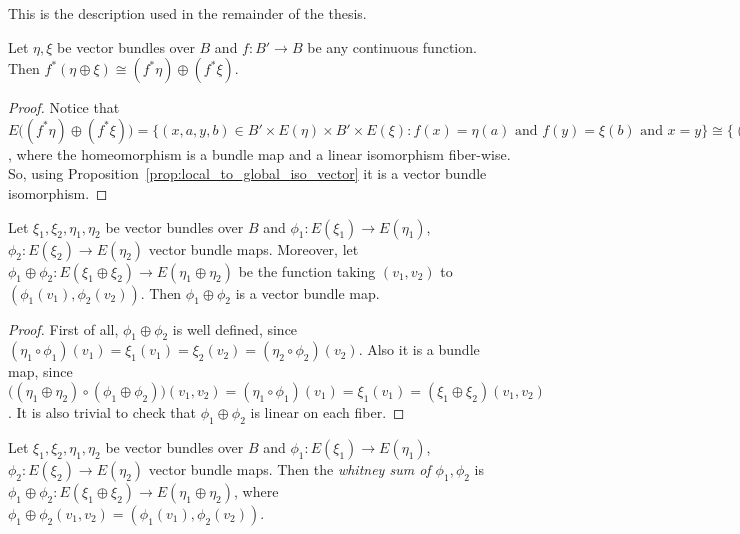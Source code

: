 This is the description used in the remainder of the thesis.
\begin{lemma}\label{lem:induced_sum} Let $\eta,\xi$ be vector bundles over $B$ and $f:B'\to B$ be any continuous function. Then $f^*(\eta\oplus\xi)\cong(f^*\eta)\oplus(f^*\xi)$.
\end{lemma}
\begin{proof} Notice that $E\big((f^*\eta)\oplus(f^*\xi)\big)=\big\{(x,a,y,b)\in B'\times E(\eta)\times B'\times E(\xi):f(x)=\eta(a)\text{ and }f(y)=\xi(b)\text{ and }x=y\big\}\cong\big\{(x,a,b)\in B'\times E(\eta)\times E(\xi):\eta(a)=\xi(b)=x\big\}=E\big(f^*(\eta\oplus\xi)\big)$, where the homeomorphism is a bundle map and a linear isomorphism fiber-wise. So, using Proposition~\ref{prop:local_to_global_iso_vector} it is a vector bundle isomorphism.
\end{proof}

\begin{proposition} Let $\xi_1,\xi_2,\eta_1,\eta_2$ be vector bundles over $B$ and $\phi_1:E(\xi_1)\to E(\eta_1)$, $\phi_2:E(\xi_2)\to E(\eta_2)$ vector bundle maps. Moreover, let $\phi_1\oplus\phi_2:E(\xi_1\oplus\xi_2)\to E(\eta_1\oplus\eta_2)$ be the function taking $(v_1,v_2)$ to $(\phi_1(v_1),\phi_2(v_2))$. Then $\phi_1\oplus\phi_2$ is a vector bundle map.
\end{proposition}
\begin{proof} First of all, $\phi_1\oplus\phi_2$ is well defined, since $(\eta_1\circ\phi_1)(v_1)=\xi_1(v_1)=\xi_2(v_2)=(\eta_2\circ\phi_2)(v_2)$. Also it is a bundle map, since $\big((\eta_1\oplus\eta_2)\circ(\phi_1\oplus\phi_2)\big)(v_1,v_2)=(\eta_1\circ\phi_1)(v_1)=\xi_1(v_1)=(\xi_1\oplus\xi_2)(v_1,v_2)$. It is also trivial to check that $\phi_1\oplus\phi_2$ is linear on each fiber.
\end{proof}
\begin{definition}\label{def:wh_sum_map} Let $\xi_1,\xi_2,\eta_1,\eta_2$ be vector bundles over $B$ and $\phi_1:E(\xi_1)\to E(\eta_1)$, $\phi_2:E(\xi_2)\to E(\eta_2)$ vector bundle maps. Then the \emph{whitney sum of $\phi_1,\phi_2$} is $\phi_1\oplus\phi_2:E(\xi_1\oplus\xi_2)\to E(\eta_1\oplus\eta_2)$, where $\phi_1\oplus\phi_2(v_1,v_2)=(\phi_1(v_1),\phi_2(v_2))$.
\end{definition}

